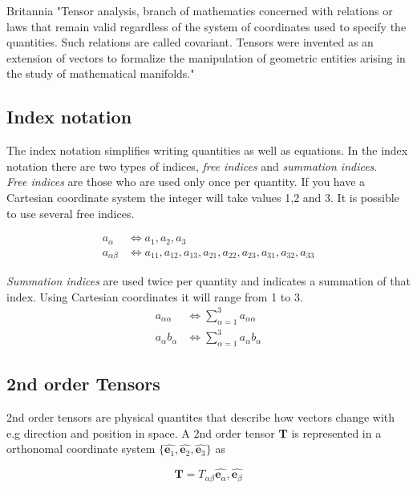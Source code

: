 Britannia
"Tensor analysis, branch of mathematics concerned with relations or laws that remain valid regardless of the system of coordinates used to specify the quantities. Such relations are called covariant. Tensors were invented as an extension of vectors to formalize the manipulation of geometric entities arising in the study of mathematical manifolds."

\subsection{Index notation}
The index notation simplifies writing quantities as well as equations. In the index notation there are two types of indices, \textit{free indices} and \textit{summation indices}.\\

\textit{Free indices} are those who are used only once per quantity. If you have a Cartesian coordinate system the integer will take values 1,2 and 3. It is possible to use several free indices.

\begin{align*} 
    a_\alpha  &\Leftrightarrow a_1 , a_2, a_3 \\ 
   a_{\alpha \beta}  &\Leftrightarrow a_{11},a_{12},a_{13},a_{21},a_{22},a_{23},a_{31},a_{32},a_{33}
\end{align*}

\textit{Summation indices} are used twice per quantity and indicates a  summation of that index. Using Cartesian coordinates it will range from 1 to 3.
\begin{align*} 
    a_{\alpha \alpha}  &\Leftrightarrow \sum\limits_{\alpha=1}^3  a_{\alpha \alpha} \\ 
   a_{\alpha}b_\alpha  &\Leftrightarrow \sum\limits_{\alpha=1}^3  a_{\alpha}b_\alpha 
\end{align*}

\subsection{2nd order Tensors}
2nd order tensors are physical quantites that describe how vectors change with e.g direction and position in space. A 2nd order tensor \textbf{T} is represented in a orthonomal coordinate system $\{\hat{\textbf{e}_1},\hat{\textbf{e}_2} , \hat{\textbf{e}_3}\}$ as

\begin{equation}
\textbf{T} = T_{\alpha\beta}\hat{\textbf{e}_\alpha},\hat{\textbf{e}_\beta}
\end{equation}


